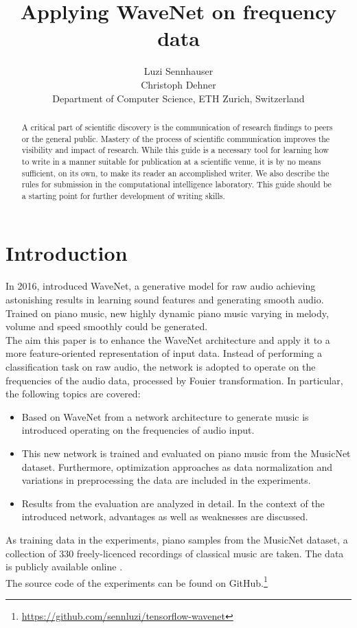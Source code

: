 \documentclass[10pt,conference,compsocconf]{IEEEtran}
\begin{document}
\title{Applying WaveNet on frequency data}

\author{
  Luzi Sennhauser\\
  Christoph Dehner\\
  Department of Computer Science, ETH Zurich, Switzerland
}

\maketitle

\begin{abstract}
  A critical part of scientific discovery is the
  communication of research findings to peers or the general public.
  Mastery of the process of scientific communication improves the
  visibility and impact of research. While this guide is a necessary
  tool for learning how to write in a manner suitable for publication
  at a scientific venue, it is by no means sufficient, on its own, to
  make its reader an accomplished writer. We also describe the rules
  for submission in the computational intelligence laboratory.
  This guide should be a
  starting point for further development of writing skills.
\end{abstract}

\section{Introduction}
In 2016, \cite{wavenet} introduced WaveNet, a generative model for raw audio achieving astonishing results in learning sound features and generating smooth audio. Trained on piano music, new highly dynamic piano music varying in melody, volume and speed smoothly could be generated.\\
The aim this paper is to enhance the WaveNet architecture and apply it to a more feature-oriented representation of input data. Instead of performing a classification task on raw audio, the network is adopted to operate on the frequencies of the audio data, processed by Fouier transformation. In particular, the following topics are covered:
\begin{itemize}
\item Based on WaveNet from \cite{wavenet} a network architecture to generate music is introduced operating on the frequencies of audio input.
\item This new network is trained and evaluated on piano music from the MusicNet dataset. Furthermore, optimization approaches as data normalization and variations in preprocessing the data are included in the experiments.
\item Results from the evaluation are analyzed in detail. In the context of the introduced network, advantages as well as weaknesses are discussed. 
\end{itemize}
As training data in the experiments, piano samples from the MusicNet dataset, a collection of 330 freely-licenced recordings of classical music are taken. The data is publicly available online \cite{musicnet}.\\
The source code of the experiments can be found on GitHub.\footnote{\url{https://github.com/sennluzi/tensorflow-wavenet}}
\end{document}
